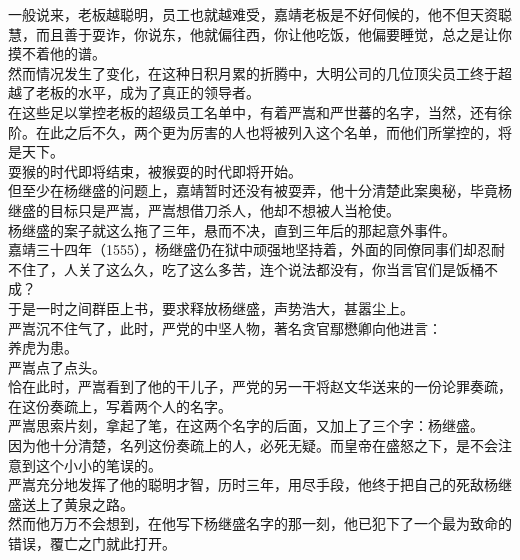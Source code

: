 \begin{multicols}{\theparacolNo}
一般说来，老板越聪明，员工也就越难受，嘉靖老板是不好伺候的，他不但天资聪慧，而且善于耍诈，你说东，他就偏往西，你让他吃饭，他偏要睡觉，总之是让你摸不着他的谱。\\

然而情况发生了变化，在这种日积月累的折腾中，大明公司的几位顶尖员工终于超越了老板的水平，成为了真正的领导者。\\

在这些足以掌控老板的超级员工名单中，有着严嵩和严世蕃的名字，当然，还有徐阶。在此之后不久，两个更为厉害的人也将被列入这个名单，而他们所掌控的，将是天下。\\

耍猴的时代即将结束，被猴耍的时代即将开始。\\

但至少在杨继盛的问题上，嘉靖暂时还没有被耍弄，他十分清楚此案奥秘，毕竟杨继盛的目标只是严嵩，严嵩想借刀杀人，他却不想被人当枪使。\\

杨继盛的案子就这么拖了三年，悬而不决，直到三年后的那起意外事件。\\

嘉靖三十四年（1555），杨继盛仍在狱中顽强地坚持着，外面的同僚同事们却忍耐不住了，人关了这么久，吃了这么多苦，连个说法都没有，你当言官们是饭桶不成？\\

于是一时之间群臣上书，要求释放杨继盛，声势浩大，甚嚣尘上。\\

严嵩沉不住气了，此时，严党的中坚人物，著名贪官鄢懋卿向他进言：\\

养虎为患。\\

严嵩点了点头。\\

恰在此时，严嵩看到了他的干儿子，严党的另一干将赵文华送来的一份论罪奏疏，在这份奏疏上，写着两个人的名字。\\

严嵩思索片刻，拿起了笔，在这两个名字的后面，又加上了三个字：杨继盛。\\

因为他十分清楚，名列这份奏疏上的人，必死无疑。而皇帝在盛怒之下，是不会注意到这个小小的笔误的。\\

严嵩充分地发挥了他的聪明才智，历时三年，用尽手段，他终于把自己的死敌杨继盛送上了黄泉之路。\\

然而他万万不会想到，在他写下杨继盛名字的那一刻，他已犯下了一个最为致命的错误，覆亡之门就此打开。\\


\end{multicols}
